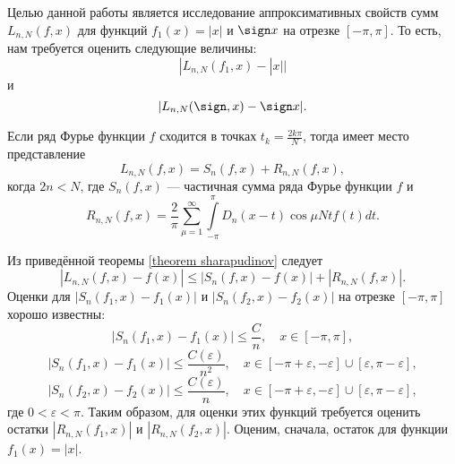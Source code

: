 Целью данной работы является исследование аппроксимативных свойств сумм $L_{n,N}(f,x)$ для функций
$f_1(x) = |x|$ и $\sign x$ на отрезке $[-\pi, \pi]$. То есть, нам требуется оценить следующие величины:
\begin{equation*}
  |L_{n,N}(f_1,x) - |x||
\end{equation*}
и
\begin{equation*}
  |L_{n,N}(\sign,x) - \sign x|.
\end{equation*}
\begin{lemma}[Шарапудинов] \label{theorem sharapudinov}
  Если ряд Фурье функции $f$ сходится в точках $t_k = \frac{2k\pi}{N}$, тогда имеет место представление
  \begin{equation}
    L_{n,N}(f,x) = S_n(f,x) + R_{n,N}(f,x), \label{iishar_Ln_eq_Sn_Rn}
  \end{equation}
  когда $2n < N$, где $S_n(f,x)$ --- частичная сумма ряда Фурье функции $f$ и
  \begin{equation*}
    R_{n,N}(f,x) = \frac2\pi \sum\limits_{\mu=1}^{\infty} \int\limits_{-\pi}^{\pi} D_n(x-t) \cos \mu N t f(t) dt.
  \end{equation*}
\end{lemma}
Из приведённой теоремы \ref{theorem sharapudinov} следует
\begin{equation}
  |L_{n,N}(f,x) - f(x)| \leq |S_n(f,x) - f(x)| + |R_{n,N}(f,x)|. \label{Ln = Sn + Rn}
\end{equation}
Оценки для $|S_n(f_1,x) - f_1(x)|$ и $|S_n(f_2,x) - f_2(x)|$ на отрезке $[-\pi,\pi]$ хорошо известны:
\begin{equation}
  |S_n(f_1,x) - f_1(x)| \leq \frac{C}{n}, \quad x \in [-\pi, \pi], \label{Sn1 -pi pi}
\end{equation}
\begin{equation}
  |S_n(f_1,x) - f_1(x)| \leq \frac{C(\varepsilon)}{n^2}, \quad x \in [-\pi + \varepsilon,- \varepsilon] \cup [\varepsilon, \pi - \varepsilon], \label{Sn1 eps pi - eps}
\end{equation}
\begin{equation}
  |S_n(f_2,x) - f_2(x)| \leq \frac{C(\varepsilon)}{n}, \quad x \in [-\pi + \varepsilon,- \varepsilon] \cup [\varepsilon, \pi - \varepsilon], \label{Sn2 eps pi - eps}
\end{equation}
где $0 < \varepsilon < \pi$.
Таким образом, для оценки этих функций требуется оценить остатки $|R_{n,N}(f_1,x)|$ и $|R_{n,N}(f_2,x)|$.
Оценим, сначала, остаток для функции $f_1(x) = |x|$.

